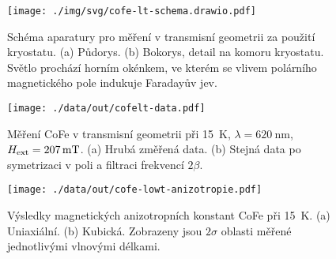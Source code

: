 \begin{figure}[htbp]
    \centering
    \texttt{[image: ./img/svg/cofe-lt-schema.drawio.pdf]}
    \caption{Schéma aparatury pro měření v transmisní geometrii za použití kryostatu. (a) Půdorys. (b) Bokorys, detail na komoru kryostatu.
    Světlo prochází horním okénkem, ve kterém se vlivem polárního magnetického pole indukuje Faradayův jev.}
    \label{fig:vysledky-cofe-lowt-schema}
\end{figure}

\begin{figure}[htbp]
    \centering
        \texttt{[image: ./data/out/cofelt-data.pdf]}
        \caption{Měření CoFe v transmisní geometrii při \SI{15}{\kelvin}, $\lambda=\SI{620}{\nano\meter}$, $H_\textrm{ext}=\SI{207}{\milli\tesla}$. (a) Hrubá změřená data. (b) Stejná data po symetrizaci v poli a filtraci frekvencí $2\beta$.}
    \label{fig:vysledky-cofe-lowt-data}
\end{figure}

\begin{figure}[htbp]
    \centering
    \texttt{[image: ./data/out/cofe-lowt-anizotropie.pdf]}
    \caption{Výsledky magnetických anizotropních konstant CoFe při \SI{15}{\kelvin}. (a) Uniaxiální. (b) Kubická. Zobrazeny jsou $2\sigma$ oblasti měřené jednotlivými vlnovými délkami.}
    \label{fig:vysledky-cofe-lowt-anizotropie}
\end{figure}


